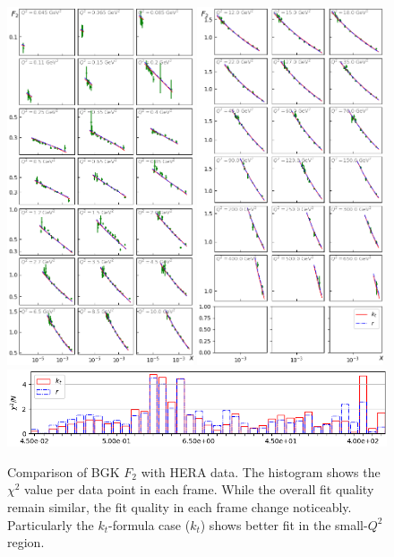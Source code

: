 \documentclass[11pt]{article}
\numberwithin{equation}{section}
\numberwithin{table}{section}
\numberwithin{figure}{section}
\begin{document}
\begin{figure}[p]
\includegraphics[width=0.49\textwidth]{./plots/Figure_2-1.png}
\includegraphics[width=0.49\textwidth]{./plots/Figure_2-2.png}
\includegraphics[width=\textwidth]{./plots/Figure_2-3.png}
\caption{Comparison of BGK $F_2$ with HERA data. The histogram shows the $\chi^2$ value per data point in each frame. While the overall fit quality remain similar, the fit quality in each frame change noticeably. Particularly the $k_t$-formula case ($k_t$) shows better fit in the small-$Q^2$ region.}
\label{fig:BGK-Grid}
\end{figure}
\end{document}
